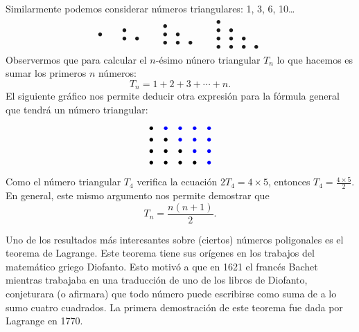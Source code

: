 Similarmente podemos considerar números triangulares: 1, 3, 6, 10\dots
\begin{align*}
	\bullet
	&&
	\begin{array}{cc}
		\bullet\\
		\bullet & \bullet 
	\end{array}
	&&
	\begin{array}{ccc}
		\bullet\\
		\bullet & \bullet \\
		\bullet & \bullet & \bullet
	\end{array}
	&&
	\begin{array}{cccc}
		\bullet\\
		\bullet & \bullet \\
		\bullet & \bullet & \bullet\\
		\bullet & \bullet & \bullet & \bullet
	\end{array}
\end{align*}
Observermos que para calcular el $n$-ésimo núnero triangular $T_n$ lo que
hacemos es sumar los primeros $n$ números: 
\[
	T_n=1+2+3+\cdots+n.
\]
El siguiente gráfico nos permite deducir otra expresión para la fórmula general
que tendrá un número triangular:
\[
	\begin{array}{ccccc}
		\bullet & \textcolor{blue}{\bullet} & \textcolor{blue}{\bullet} & \textcolor{blue}{\bullet} & \textcolor{blue}{\bullet}\\
		\bullet & \bullet & \textcolor{blue}{\bullet} & \textcolor{blue}{\bullet} & \textcolor{blue}{\bullet}\\
		\bullet & \bullet & \bullet & \textcolor{blue}{\bullet} & \textcolor{blue}{\bullet} \\
		\bullet & \bullet & \bullet & \bullet & \textcolor{blue}{\bullet}
	\end{array}
\]
Como el número triangular $T_4$ verifica la ecuación $2T_4=4\times 5$, entonces
$T_4=\frac{4\times 5}{2}$. En general, este mismo argumento nos permite
demostrar que
\[
	T_n=\frac{n(n+1)}{2}.
\]

Uno de los resultados más interesantes sobre (ciertos) números poligonales es el teorema
de Lagrange. Este teorema tiene sus orígenes en los trabajos del matemático
griego Diofanto. Esto motivó a que en 1621 el francés Bachet mientras trabajaba
en una traducción de uno de los libros de Diofanto, conjeturara (o afirmara)
que todo número puede escribirse como suma de a lo sumo cuatro cuadrados. La
primera demostración de este teorema fue dada por Lagrange en 1770.

